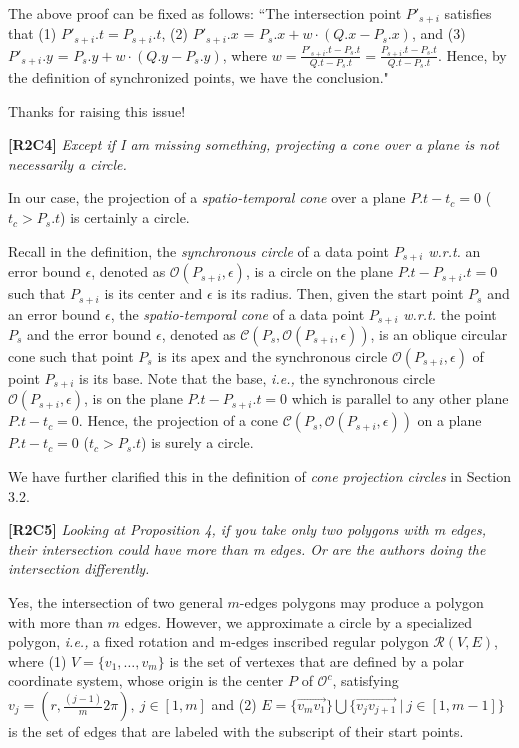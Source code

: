 \documentclass{letter}
\newcommand{\ie}{\emph{i.e.,}\xspace}
\newcommand{\wrt}{\emph{w.r.t.}\xspace}
\newcommand{\cone}[1]{{$\mathcal{C}{#1}$}}
\renewcommand{\circle}[1]{{$\mathcal{O}{#1}$}}
\newcommand{\pcircle}[1]{{$\mathcal{O}^c{#1}$}}
\begin{document}
The above proof can be fixed as follows: ``The intersection point $P'_{s+i}$ satisfies that
(1) $P'_{s+i}.t = P_{s+i}.t$,
(2) $P'_{s+i}.x$ = $P_s.x +  w\cdot(Q.x - P_s.x)$, and
(3) $P'_{s+i}.y$ = $P_s.y +  w\cdot(Q.y - P_s.y)$,
where $w= \frac{P'_{s+i}.t - P_{s}.t}{Q.t - P_{s}.t}= \frac{P_{s+i}.t-P_s.t}{Q.t-P_s.t}$.
Hence, by the definition of synchronized points, we have the conclusion."

Thanks for raising this issue!


\textbf{[R2C4]} \emph{Except if I am missing something, projecting a cone over a plane is not necessarily a circle.}

In our case, the projection of a \emph{spatio-temporal cone} over a plane $P.t- t_c = 0$ ($t_c > P_s.t$) is certainly a circle.

Recall in the definition, the \emph{synchronous circle} of a data point $P_{s+i}$ \wrt an error bound $\epsilon$, denoted as \circle{(P_{s+i}, \epsilon)}, is a circle on the plane $P.t-P_{s+i}.t = 0$ such that $P_{s+i}$ is its center and $\epsilon$ is its radius.
%
Then, given the start point $P_s$ and an error bound $\epsilon$, the \emph{spatio-temporal cone} of a data point $P_{s+i}$ \wrt the point $P_s$ and the error bound $\epsilon$, denoted as \cone{(P_s, \mathcal{O}(P_{s+i}, \epsilon))}, is an oblique circular cone such that point $P_s$ is its apex and the synchronous circle $\mathcal{O}(P_{s+i}, \epsilon)$ of point $P_{s+i}$ is its base. Note that the base, \ie the synchronous circle $\mathcal{O}(P_{s+i}, \epsilon)$, is on the plane $P.t-P_{s+i}.t = 0$ which is  parallel to any other plane $P.t- t_c = 0$. Hence, the  projection of a cone \cone{(P_s, \mathcal{O}(P_{s+i}, \epsilon))} on a plane $P.t- t_c = 0$ ($t_c > P_s.t$) is surely a circle.

We have further clarified this in the definition of \emph{cone projection circles} in Section 3.2.

\textbf{[R2C5]} \emph{Looking at Proposition 4, if you take only two polygons with m edges, their intersection could have more than m edges. Or are the authors doing the intersection differently.}

Yes, the intersection of two {general} $m$-edges polygons may produce a polygon with more than $m$ edges.
%
However, we approximate a circle by a {specialized} polygon, \ie a fixed rotation and m-edges inscribed regular polygon $\mathcal{R}(V, E)$,
where (1) $V=\{v_1, \ldots, v_{m}\}$ is the set of vertexes that are defined by a polar coordinate system, whose origin is the center $P$ of \pcircle{}, satisfying $v_j = (r, \frac{(j-1)}{m}2\pi), ~j \in [1, m]$
and (2) $E= \{\overrightarrow{v_mv_1}\} \bigcup \{\overrightarrow{v_jv_{j+1}}\ |\ j\in [1, m-1]\}$ is the set of edges that are labeled with the subscript of their start points.
\end{document}
